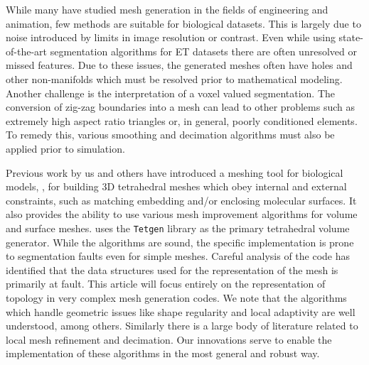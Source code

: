 \par While many have studied mesh generation in the fields of engineering and animation, few methods are suitable for biological datasets.
This is largely due to noise introduced by limits in image resolution or contrast.
Even while using state-of-the-art segmentation algorithms for ET datasets there are often unresolved or missed features.
Due to these issues, the generated meshes often have holes and other non-manifolds which must be resolved prior to mathematical modeling.
Another challenge is the interpretation of a voxel valued segmentation.
The conversion of zig-zag boundaries into a mesh can lead to other problems such as extremely high aspect ratio triangles or, in general, poorly conditioned elements\cite{Yu2008a}.
To remedy this, various smoothing and decimation algorithms must also be applied prior to simulation.

\par Previous work by us and others have introduced a meshing tool for biological models, \gamer, for building 3D tetrahedral meshes which obey internal and external constraints, such as matching embedding and/or enclosing molecular surfaces.
It also provides the ability to use various mesh improvement algorithms for volume and surface meshes\cite{Gao2013,Yu2008}.
\gamer uses the \texttt{Tetgen} library as the primary tetrahedral volume generator\cite{Si2015a}.
While the algorithms are sound, the specific implementation is prone to segmentation faults even for simple meshes.
Careful analysis of the code has identified that the data structures used for the representation of the mesh is primarily at fault.
This article will focus entirely on the representation of topology in very complex mesh generation codes.
We note that the algorithms which handle geometric issues like shape regularity and local adaptivity are well understood\cite{Babuska1976,Liu1994}, among others.
Similarly there is a large body of literature related to local mesh refinement and decimation\cite{Bank1983,Bank1996}.
Our innovations serve to enable the implementation of these algorithms in the most general and robust way.

